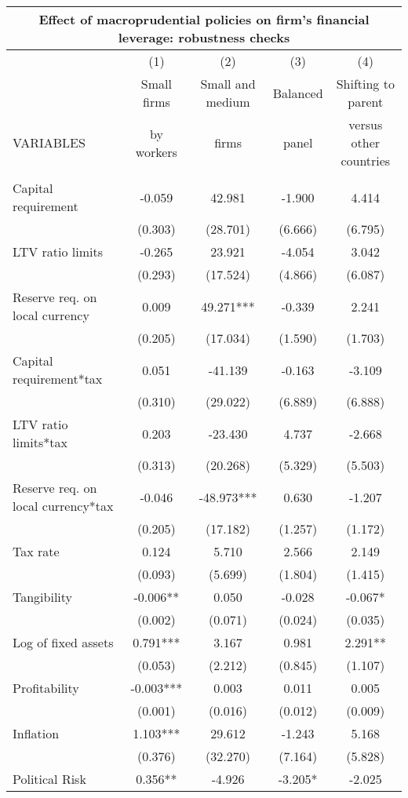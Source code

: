 \begin{tabular}{lcccc}
\multicolumn{5}{c}{Effect of macroprudential policies on firm's financial leverage: robustness checks} \\ \hline
 & (1) & (2) & (3) & (4) \\
 & Small firms & Small and medium & Balanced & Shifting to parent \\
VARIABLES & by workers & firms & panel & versus other countries \\ \hline
 &  &  &  &  \\
Capital requirement & -0.059 & 42.981 & -1.900 & 4.414 \\
 & (0.303) & (28.701) & (6.666) & (6.795) \\
LTV ratio limits & -0.265 & 23.921 & -4.054 & 3.042 \\
 & (0.293) & (17.524) & (4.866) & (6.087) \\
Reserve req. on local currency & 0.009 & 49.271*** & -0.339 & 2.241 \\
 & (0.205) & (17.034) & (1.590) & (1.703) \\
Capital requirement*tax & 0.051 & -41.139 & -0.163 & -3.109 \\
 & (0.310) & (29.022) & (6.889) & (6.888) \\
LTV ratio limits*tax & 0.203 & -23.430 & 4.737 & -2.668 \\
 & (0.313) & (20.268) & (5.329) & (5.503) \\
Reserve req. on local currency*tax & -0.046 & -48.973*** & 0.630 & -1.207 \\
 & (0.205) & (17.182) & (1.257) & (1.172) \\
Tax rate & 0.124 & 5.710 & 2.566 & 2.149 \\
 & (0.093) & (5.699) & (1.804) & (1.415) \\
Tangibility & -0.006** & 0.050 & -0.028 & -0.067* \\
 & (0.002) & (0.071) & (0.024) & (0.035) \\
Log of fixed assets & 0.791*** & 3.167 & 0.981 & 2.291** \\
 & (0.053) & (2.212) & (0.845) & (1.107) \\
Profitability & -0.003*** & 0.003 & 0.011 & 0.005 \\
 & (0.001) & (0.016) & (0.012) & (0.009) \\
Inflation & 1.103*** & 29.612 & -1.243 & 5.168 \\
 & (0.376) & (32.270) & (7.164) & (5.828) \\
Political Risk & 0.356** & -4.926 & -3.205* & -2.025 \\

\end{tabular}
